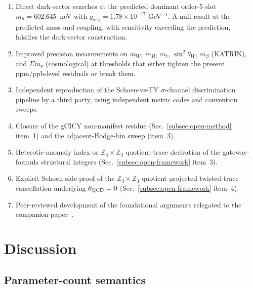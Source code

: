 ﻿\documentclass[reprint,amsmath,amssymb,aps,prd,longbibliography,floatfix]{revtex4-2}
\begin{document}
\begin{enumerate}
\item Direct dark-sector searches at the predicted dominant order-5
slot $m_5 = 602.645$~neV with $g_{a\gamma\gamma} = 1.78 \times 10^{-17}$
GeV$^{-1}$. A null result at the predicted mass and coupling, with
sensitivity exceeding the prediction, falsifies the dark-sector
construction.

\item Improved precision measurements on $m_W$, $m_H$, $m_t$,
$\sin^2\theta_W$, $m_\beta$ (KATRIN), and $\Sigma m_\nu$
(cosmological) at thresholds that either tighten the present
ppm/ppb-level residuals or break them.

\item Independent reproduction of the Schoen-vs-TY $\sigma$-channel
discrimination pipeline by a third party, using independent metric
codes and convention sweeps.

\item Closure of the gCICY non-manifest residue
(Sec.~\ref{subsec:open-method} item~1) and the adjacent-Hodge-bin
sweep (item~3).

\item Heterotic-anomaly index or $\mathbb{Z}_3 \times \mathbb{Z}_3$
quotient-trace derivation of the gateway-formula structural integers
(Sec.~\ref{subsec:open-framework} item~3).

\item Explicit Schoen-side proof of the
$\mathbb{Z}_3 \times \mathbb{Z}_3$ quotient-projected twisted-trace
cancellation underlying $\theta_{\rm QCD} = 0$
(Sec.~\ref{subsec:open-framework} item~4).

\item Peer-reviewed development of the foundational arguments
relegated to the companion paper~\cite{UnreasonableEffectiveness}.
\end{enumerate}

\section{Discussion}
\label{sec:discussion}

\subsection{Parameter-count semantics}
\end{document}
